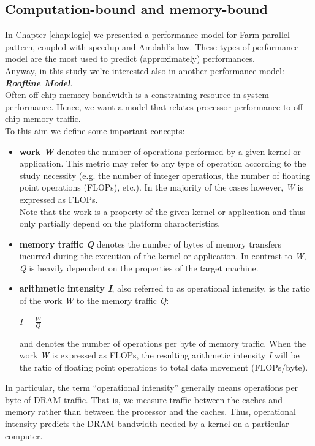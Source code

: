 \subsection{Computation-bound and memory-bound}
	In Chapter \ref{chap:logic} we presented a performance model for Farm parallel pattern, coupled with speedup and Amdahl's law. These types of performance model are the most used to predict (approximately) performances.\\
	Anyway, in this study we're interested also in another performance model: \textit{\textbf{Roofline Model}}.\\
	Often off-chip memory bandwidth is a constraining  resource  in  system  performance.
	Hence, we want a model that relates processor  performance  to off-chip  memory  traffic. \\
	To this aim we define some important concepts:
	\begin{itemize}
		\item \textbf{work \textit{W}} denotes the number of operations performed by a given kernel or application. This metric may refer to any type of operation according to the study necessity (e.g. the number of integer operations, the number of floating point operations (FLOPs), etc.). In the majority of the cases however, \textit{W} is expressed as FLOPs.\\	
		Note that the work is a property of the given kernel or application and thus only partially depend on the platform characteristics. 
		
		\item \textbf{memory traffic \textit{Q}} denotes the number of bytes of memory transfers incurred during the execution of the kernel or application. In contrast to \textit{W}, \textit{Q} is heavily dependent on the properties of the target machine.%
		
		\item \textbf{arithmetic intensity \textit{I}}, also referred to as operational intensity, is the ratio of the work \textit{W} to the memory traffic \textit{Q}:
		\begin{center}
			\( I = \frac{W}{Q}\)
		\end{center}
		and denotes the number of operations per byte of memory traffic. When the work \textit{W} is expressed as FLOPs, the resulting arithmetic intensity \textit{I} will be the ratio of floating point operations to total data movement (FLOPs/byte)\cite{optimizingcuda}. 
	\end{itemize}
	In particular, the term  “operational intensity” generally means operations per byte of  DRAM  traffic. That is, we measure traffic between the caches and memory rather than between the processor and the caches. 
	Thus, operational intensity predicts the DRAM bandwidth needed by a kernel on a particular computer\cite{rooflinepaper,rooflineslides}.\\
	
